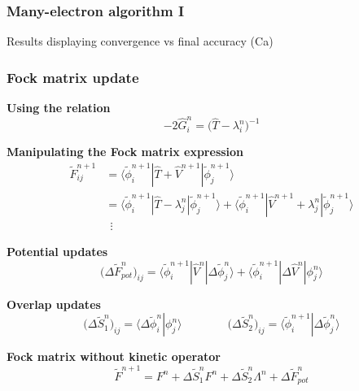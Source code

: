 \documentclass[mathserif, 10pt]{beamer}
\begin{document}
\begin{frame}
    \frametitle{Many-electron algorithm I}
    Results displaying convergence vs final accuracy (Ca)
\end{frame}

\begin{frame}
    \frametitle{Fock matrix update}
    \centering
    \textbf{Using the relation}
    \begin{equation}
        \nonumber
        -2\hat{G}_i^n = \big(\hat{T} - \lambda_i^n\big)^{-1}
    \end{equation}

    \vspace{3mm}

    \textbf{Manipulating the Fock matrix expression}
    \begin{align}
        \nonumber
        \tilde{F}_{ij}^{n+1}    &= 
        \langle\tilde{\phi}_i^{n+1} |
        \hat{T} + \hat{V}^{n+1}     |
        \tilde{\phi}_j^{n+1}\rangle\\
        \nonumber
			    &= 
        \langle\tilde{\phi}_i^{n+1} |
        \hat{T} - \lambda_j^n       |
        \tilde{\phi}_j^{n+1}\rangle +
        \langle\tilde{\phi}_i^{n+1} |
        \hat{V}^{n+1} + \lambda_j^n |
        \tilde{\phi}_j^{n+1}\rangle\\
        \nonumber
        &\ \ \vdots
    \end{align}

    \textbf{Potential updates}
    \begin{equation}
        \nonumber
        \big(\Delta\tilde{F}_{pot}^n\big)_{ij} =
        \langle\tilde{\phi}_i^{n+1} |
        \hat{V}^n                       |
        \Delta\tilde{\phi}_j^n\rangle + 
        \langle\tilde{\phi}_i^{n+1} |
        \Delta\hat{V}^n                 |
        \phi_j^n\rangle
    \end{equation}

    \vspace{3mm}

    \textbf{Overlap updates}
    \begin{equation}
    \nonumber
        \big(\Delta\tilde{S}_1^n\big)_{ij} =
        \langle\Delta\tilde{\phi}_i^n | \phi_j^n\rangle \qquad \qquad
        \big(\Delta \tilde{S}_2^n\big)_{ij} =
        \langle\tilde{\phi}_i^{n+1} | \Delta\tilde{\phi}_j^n\rangle
    \end{equation}

    \vspace{3mm}

    \centering
    \textbf{Fock matrix without kinetic operator}
    \begin{equation}
        \nonumber
        \tilde{F}^{n+1} = F^{n} + 
        \Delta \tilde{S}_1^n F^n +
        \Delta \tilde{S}_2^n \Lambda^n +
        \Delta \tilde{F}_{pot}^n
    \end{equation}
\end{frame}
\end{document}
